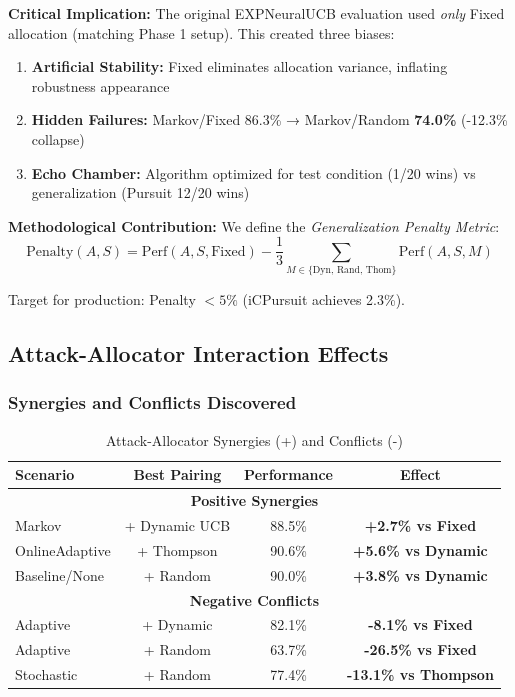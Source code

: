 \documentclass[11pt,a4paper]{article}
\newcommand{\critical}[1]{\textcolor{criticalcolor}{\textbf{#1}}}
\newcommand{\success}[1]{\textcolor{successcolor}{\textbf{#1}}}
\begin{document}
\textbf{Critical Implication:} The original EXPNeuralUCB evaluation used \textit{only} Fixed allocation (matching Phase 1 setup). This created three biases:
\begin{enumerate}
    \item \textbf{Artificial Stability:} Fixed eliminates allocation variance, inflating robustness appearance
    \item \textbf{Hidden Failures:} Markov/Fixed 86.3\% → Markov/Random \critical{74.0\%} (-12.3\% collapse)
    \item \textbf{Echo Chamber:} Algorithm optimized for test condition (1/20 wins) vs generalization (Pursuit 12/20 wins)
\end{enumerate}

\textbf{Methodological Contribution:} We define the \textit{Generalization Penalty Metric}:
\begin{equation}
\text{Penalty}(A, S) = \text{Perf}(A, S, \text{Fixed}) - \frac{1}{3}\sum_{M \in \{\text{Dyn, Rand, Thom}\}} \text{Perf}(A, S, M)
\end{equation}

Target for production: Penalty $< 5\%$ (iCPursuit achieves 2.3\%).

\subsection{Attack-Allocator Interaction Effects}

\subsubsection{Synergies and Conflicts Discovered}

\begin{table}[H]
\centering
\footnotesize
\caption{Attack-Allocator Synergies (+) and Conflicts (-)}
\begin{tabular}{|l|c|c|c|}
\hline
\textbf{Scenario} & \textbf{Best Pairing} & \textbf{Performance} & \textbf{Effect} \\
\hline
\hline
\multicolumn{4}{|c|}{\success{Positive Synergies}} \\
\hline
Markov & + Dynamic UCB & 88.5\% & \success{+2.7\% vs Fixed} \\
OnlineAdaptive & + Thompson & 90.6\% & \success{+5.6\% vs Dynamic} \\
Baseline/None & + Random & 90.0\% & \success{+3.8\% vs Dynamic} \\
\hline
\multicolumn{4}{|c|}{\critical{Negative Conflicts}} \\
\hline
Adaptive & + Dynamic & 82.1\% & \critical{-8.1\% vs Fixed} \\
Adaptive & + Random & 63.7\% & \critical{-26.5\% vs Fixed} \\
Stochastic & + Random & 77.4\% & \critical{-13.1\% vs Thompson} \\
\hline
\end{tabular}
\end{table}
\end{document}
